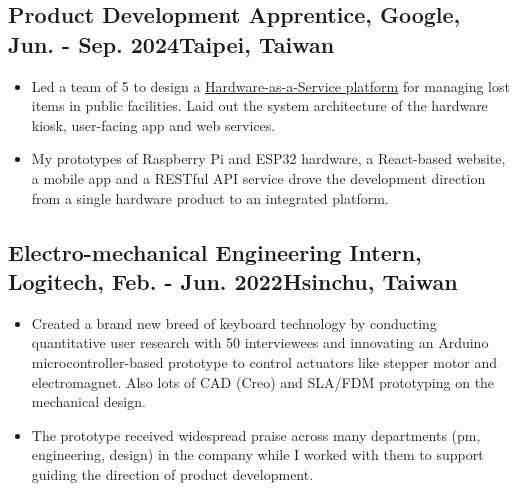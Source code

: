 \documentclass[12pt]{article}
\begin{document}
    \subsection*{Product Development Apprentice, Google, Jun. - Sep. 2024\hfill Taipei, Taiwan}
        { \small
        \begin{itemize}
            \item Led a team of 5 to design a \href{https://bencer3283.github.io/portfolio/nexus/}{\underline{Hardware-as-a-Service platform}} for managing lost items in public facilities. Laid out the system architecture of the hardware kiosk, user-facing app and web services.
            \item My prototypes of Raspberry Pi and ESP32 hardware, a React-based website, a mobile app and a RESTful API service drove the development direction from a single hardware product to an integrated platform.
        \end{itemize}
        }
    \subsection*{Electro-mechanical Engineering Intern, Logitech, Feb. - Jun. 2022\hfill Hsinchu, Taiwan}
        { \small
        \begin{itemize}
            \item Created a brand new breed of keyboard technology by conducting quantitative user research with 50 interviewees and innovating an Arduino microcontroller-based prototype to control actuators like stepper motor and electromagnet. Also lots of CAD (Creo) and SLA/FDM prototyping on the mechanical design. 
            \item The prototype received widespread praise across many departments (pm, engineering, design) in the company while I worked with them to support guiding the direction of product development. 
        \end{itemize}
        }
    
\end{document}
